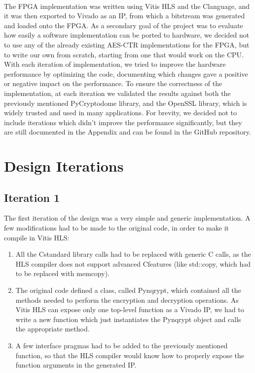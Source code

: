 \documentclass[12pt,oneside,a4paper]{article}
\def\CC{{C\nolinebreak[4]\hspace{-.05em}\raisebox{.4ex}{\tiny\bf ++}}}
\begin{document}
\\The FPGA implementation was written using Vitis HLS and the \CC language, and it was then exported to Vivado as an IP, from which a bitstream was generated and loaded onto the FPGA.
As a secondary goal of the project was to evaluate how easily a software implementation can be ported to hardware, we decided not to use any of the already existing AES-CTR implementations for the FPGA, but to write our own from scratch, starting from one that would work on the CPU.
With each iteration of implementation, we tried to improve the hardware performance by optimizing the code, documenting which changes gave a positive or negative impact on the performance.
To ensure the correctness of the implementation, at each iteration we validated the results against both the previously mentioned PyCryptodome library, and the OpenSSL library, which is widely trusted and used in many applications.
For brevity, we decided not to include iterations which didn't improve the performance significantly, but they are still documented in the Appendix and can be found in the GitHub repository.

\section{Design Iterations} \label{sec:iterations}

\subsection{Iteration 1} \label{subsec:iter1}
The first iteration of the design was a very simple and generic implementation. A few modifications had to be made to the original code, in order to make it compile in Vitis HLS:
\begin{enumerate}
	\item All the \CC standard library calls had to be replaced with generic C calls, as the HLS compiler does not support advanced \CC features (like std::copy, which had to be replaced with memcopy).
	\item The original code defined a class, called Pynqrypt, which contained all the methods needed to perform the encryption and decryption operations. As Vitis HLS can expose only one top-level function as a Vivado IP, we had to write a new function which just instantiates the Pynqrypt object and calls the appropriate method.
	\item A few interface pragmas had to be added to the previously mentioned function, so that the HLS compiler would know how to properly expose the function arguments in the generated IP.
\end{enumerate}
\end{document}
